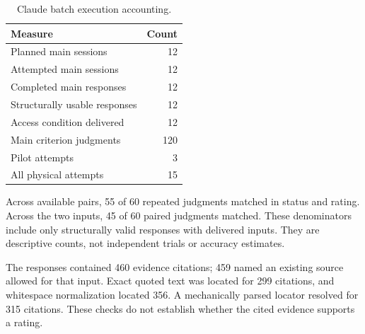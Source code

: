 \begin{table}[t]
\caption{Claude batch execution accounting.}
\label{tab:execution-claude}
\centering\begin{tabular}{lr}\toprule
Measure & Count \\
\midrule
Planned main sessions & 12 \\
Attempted main sessions & 12 \\
Completed main responses & 12 \\
Structurally usable responses & 12 \\
Access condition delivered & 12 \\
Main criterion judgments & 120 \\
Pilot attempts & 3 \\
All physical attempts & 15 \\
\bottomrule\end{tabular}
\end{table}
Across available pairs, 55 of 60 repeated judgments matched in status and rating. Across the two inputs, 45 of 60 paired judgments matched. These denominators include only structurally valid responses with delivered inputs. They are descriptive counts, not independent trials or accuracy estimates.

The responses contained 460 evidence citations; 459 named an existing source allowed for that input. Exact quoted text was located for 299 citations, and whitespace normalization located 356. A mechanically parsed locator resolved for 315 citations. These checks do not establish whether the cited evidence supports a rating.
